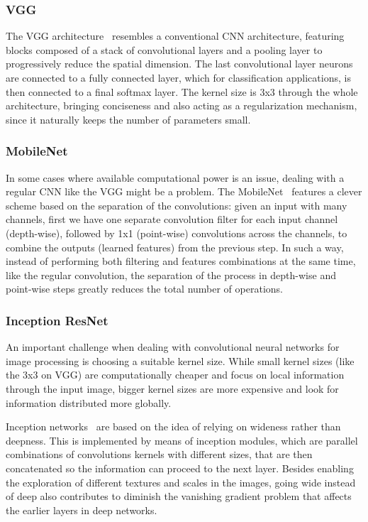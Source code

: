 \documentclass[sn-basic]{sn-jnl}%
\theoremstyle{thmstyleone}%
\theoremstyle{thmstyletwo}%
\theoremstyle{thmstylethree}%
\begin{document}
\subsubsection{VGG}
The VGG architecture~\citep{vgg-paper} resembles a conventional CNN architecture, featuring blocks composed of a stack of convolutional layers and a pooling layer to progressively reduce the spatial dimension. The last convolutional layer neurons are connected to a fully connected layer, which for classification applications, is then connected to a final softmax layer. The kernel size is 3x3 through the whole architecture, bringing conciseness and also acting as a regularization mechanism, since it naturally keeps the number of parameters small.


\subsubsection{MobileNet}
In some cases where available computational power is an issue, dealing with a regular CNN like the VGG might be a problem. The MobileNet~\citep{mobilenet-paper} features a clever scheme based on the separation of the convolutions: given an input with many channels, first we have one separate convolution filter for each input channel (depth-wise), followed by 1x1 (point-wise) convolutions across the channels, to combine the outputs (learned features) from the previous step. In such a way, instead of performing both filtering and features combinations at the same time, like the regular convolution, the separation of the process in depth-wise and point-wise steps greatly reduces the total number of operations.


\subsubsection{Inception ResNet}
An important challenge when dealing with convolutional neural networks for image processing is choosing a suitable kernel size. While small kernel sizes (like the 3x3 on VGG) are computationally cheaper and focus on local information through the input image, bigger kernel sizes are more expensive and look for information distributed more globally. 

Inception networks~\citep{inception-paper} are based on the idea of relying on wideness rather than deepness. This is implemented by means of inception modules, which are parallel combinations of convolutions kernels with different sizes, that are then concatenated so the information can proceed to the next layer. Besides enabling the exploration of different textures and scales in the images, going wide instead of deep also contributes to diminish the vanishing gradient problem that affects the earlier layers in deep networks.
\end{document}
